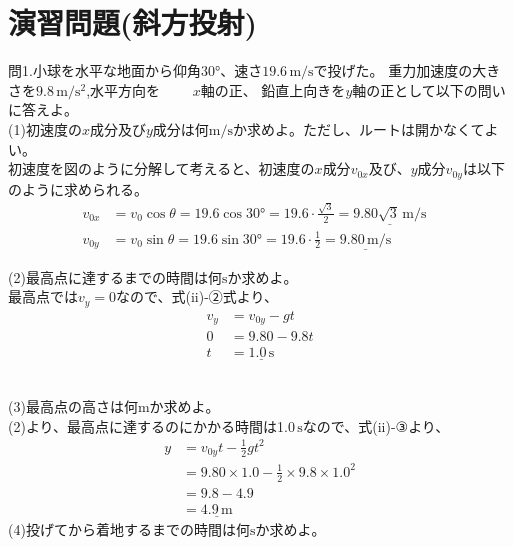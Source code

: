 \documentclass[11pt,twoside]{article}
\begin{document}
	\section{演習問題(斜方投射)}
	問1.小球を水平な地面から仰角$30°$、速さ$19.6\,\si{\metre\per\second}$で投げた。
	重力加速度の大きさを$9.8\,\si{\metre\per\second\squared}$,水平方向を　　\,\,$x$軸の正、
	鉛直上向きを$y$軸の正として以下の問いに答えよ。\\
	(1)初速度の$x$成分及び$y$成分は何$\si{\metre\per\second}$か求めよ。ただし、ルートは開かなくてよい。\\
	\color{red}
	初速度を図のように分解して考えると、初速度の$x$成分$v_{0x}$及び、$y$成分$v_{0y}$は以下のように求められる。
	\begin{align*}
		v_{0x} &= v_0\cos\theta = 19.6\cos30° = 19.6 \cdot \frac{\sqrt{3}}{2} = \underline{9.80\sqrt{3} \,\si{\metre\per\second}} &\\
		v_{0y} &= v_0\sin\theta = 19.6\sin30° = 19.6 \cdot \frac{1}{2} = \underline{9.80 \,\si{\metre\per\second}} &
	\end{align*}
	\color{black}
	\begin{minipage}[t]{0.44\linewidth}
	(2)最高点に達するまでの時間は何$\si{\second}$か求めよ。\\
	\color{red}
	最高点では$v_y=0$なので、式(ii)-②式より、
	\begin{align*}
		v_y &= v_{0y} - gt\\
		0 &= 9.80 - 9.8t\\
		t &= \underline{1.0\,\si{\second}}
	\end{align*}
	\color{black}
	\end{minipage}
	\hfill
	\begin{minipage}[t]{0.44\linewidth}
		\vspace{0.5cm}
	\end{minipage}\\
	(3)最高点の高さは何$\si{\metre}$か求めよ。\\
	\color{red}
	(2)より、最高点に達するのにかかる時間は1.0\,$\si{\second}$なので、式(ii)-③より、
	\begin{align*}
		y &= v_{0y}t -\frac{1}{2}gt^2\\
		&=9.80\times1.0-\frac{1}{2}\times9.8\times1.0^2\\
		&= 9.8-4.9\\
		&=\underline{4.9\,\si{\metre}}
	\end{align*}
	\color{black}
	\noindent
	(4)投げてから着地するまでの時間は何$\si{\second}$か求めよ。\\
\end{document}

